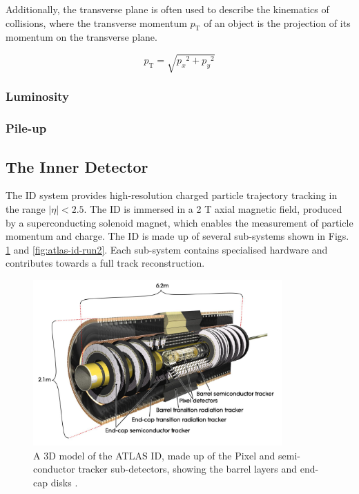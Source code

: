 Additionally, the transverse plane is often used to describe the kinematics of collisions, where the transverse momentum $p_{\text{T}}$ of an object is the projection of its momentum on the transverse plane.

%
\begin{equation}\label{eq:pt}
  p_\text{T} = \sqrt{ {p_x}^2 + {p_y}^2 }
\end{equation}


\subsubsection{Luminosity}

\subsubsection{Pile-up}



\subsection{The Inner Detector}
\label{inner-detector}

The ID system provides high-resolution charged particle trajectory tracking in the range $ \lvert \eta \rvert < 2.5$. The ID is immersed in a 2 T axial magnetic field, produced by a superconducting solenoid magnet, which enables the measurement of particle momentum and charge. The ID is made up of several sub-systems shown in Figs. \ref{fig:atlas-id-run1} and \ref{fig:atlas-id-run2}. Each sub-system contains specialised hardware and contributes towards a full track reconstruction. 

\begin{figure}[!htbp]
  \centering
  \includegraphics[width=0.85\textwidth]{images/2-LHC-ATLAS/atlas_id.jpg}
  \caption{
    A 3D model of the ATLAS ID, made up of the Pixel and semi-conductor tracker sub-detectors, showing the barrel layers and end-cap disks \cite{atlasid}.
  }
  \label{fig:atlas-id-run1}
\end{figure}


